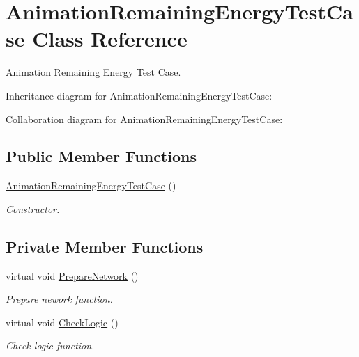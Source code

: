 \hypertarget{classAnimationRemainingEnergyTestCase}{}\section{Animation\+Remaining\+Energy\+Test\+Case Class Reference}
\label{classAnimationRemainingEnergyTestCase}


Animation Remaining Energy Test Case.  




Inheritance diagram for Animation\+Remaining\+Energy\+Test\+Case\+:


Collaboration diagram for Animation\+Remaining\+Energy\+Test\+Case\+:
\subsection*{Public Member Functions}
\begin{DoxyCompactItemize}
\item 
\hyperlink{classAnimationRemainingEnergyTestCase_a8fb7c7bc8b5e26d871597b208ff66987}{Animation\+Remaining\+Energy\+Test\+Case} ()
\begin{DoxyCompactList}\small\item\em Constructor. \end{DoxyCompactList}\end{DoxyCompactItemize}
\subsection*{Private Member Functions}
\begin{DoxyCompactItemize}
\item 
virtual void \hyperlink{classAnimationRemainingEnergyTestCase_a0b58006c5a7d9ebe7b8c918f4f214443}{Prepare\+Network} ()
\begin{DoxyCompactList}\small\item\em Prepare nework function. \end{DoxyCompactList}\item 
virtual void \hyperlink{classAnimationRemainingEnergyTestCase_a3def2f707d835583c47d9d7a28c3a291}{Check\+Logic} ()
\begin{DoxyCompactList}\small\item\em Check logic function. \end{DoxyCompactList}\end{DoxyCompactItemize}
